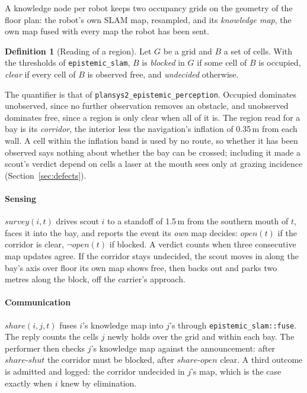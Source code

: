 \documentclass[11pt,a4paper]{article}
\theoremstyle{definition}
\newtheorem{definition}{Definition}
\newcommand{\code}[1]{\texttt{\small #1}}
\newcommand{\op}{\mathit{open}}
\begin{document}
A knowledge node per robot keeps two occupancy grids on the geometry of the
floor plan: the robot's own SLAM map, resampled, and its \emph{knowledge map},
the own map fused with every map the robot has been sent.

\begin{definition}[Reading of a region]
\label{def:reading}
Let $G$ be a grid and $B$ a set of cells. With the thresholds of
\code{epistemic\_slam}, $B$ is \emph{blocked} in $G$ if some cell of $B$ is
occupied, \emph{clear} if every cell of $B$ is observed free, and
\emph{undecided} otherwise.
\end{definition}

The quantifier is that of \code{plansys2\_epistemic\_perception}. Occupied
dominates unobserved, since no further observation removes an obstacle, and
unobserved dominates free, since a region is only clear when all of it is. The
region read for a bay is its \emph{corridor}, the interior less the
navigation's inflation of 0.35\,m from each wall. A cell within the inflation
band is used by no route, so whether it has been observed says nothing about
whether the bay can be crossed; including it made a scout's verdict depend on
cells a laser at the mouth sees only at grazing incidence
(Section~\ref{sec:defects}).

\paragraph{Sensing} $\mathit{survey}(i,t)$ drives scout $i$ to a standoff of
1.5\,m from the southern mouth of $t$, faces it into the bay, and reports the
event its \emph{own} map decides: $\op(t)$ if the corridor is clear,
$\neg\op(t)$ if blocked. A verdict counts when three consecutive map updates
agree. If the corridor stays undecided, the scout moves in along the bay's
axis over floor its own map shows free, then backs out and parks two metres
along the block, off the carrier's approach.

\paragraph{Communication} $\mathit{share}(i,j,t)$ fuses $i$'s knowledge map
into $j$'s through \code{epistemic\_slam::fuse}. The reply counts the cells $j$
newly holds over the grid and within each bay. The performer then checks $j$'s
knowledge map against the announcement: after $\mathit{share\text{-}shut}$ the
corridor must be blocked, after $\mathit{share\text{-}open}$ clear. A third
outcome is admitted and logged: the corridor undecided in $j$'s map, which is
the case exactly when $i$ knew by elimination.
\end{document}

